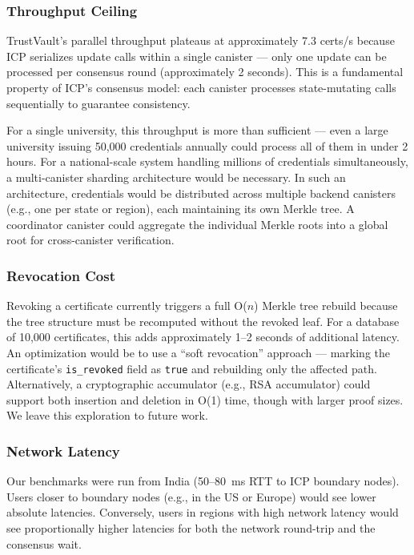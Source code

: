 \documentclass[conference]{IEEEtran}
\begin{document}
\subsubsection{Throughput Ceiling}
TrustVault's parallel throughput plateaus at approximately 7.3 certs/s because ICP serializes update calls within a single canister — only one update can be processed per consensus round (approximately 2 seconds). This is a fundamental property of ICP's consensus model: each canister processes state-mutating calls sequentially to guarantee consistency.

For a single university, this throughput is more than sufficient — even a large university issuing 50,000 credentials annually could process all of them in under 2 hours. For a national-scale system handling millions of credentials simultaneously, a multi-canister sharding architecture would be necessary. In such an architecture, credentials would be distributed across multiple backend canisters (e.g., one per state or region), each maintaining its own Merkle tree. A coordinator canister could aggregate the individual Merkle roots into a global root for cross-canister verification.

\subsubsection{Revocation Cost}
Revoking a certificate currently triggers a full O($n$) Merkle tree rebuild because the tree structure must be recomputed without the revoked leaf. For a database of 10,000 certificates, this adds approximately 1--2 seconds of additional latency. An optimization would be to use a ``soft revocation'' approach — marking the certificate's \texttt{is\_revoked} field as \texttt{true} and rebuilding only the affected path. Alternatively, a cryptographic accumulator (e.g., RSA accumulator) could support both insertion and deletion in O(1) time, though with larger proof sizes. We leave this exploration to future work.

\subsubsection{Network Latency}
Our benchmarks were run from India (50--80~ms RTT to ICP boundary nodes). Users closer to boundary nodes (e.g., in the US or Europe) would see lower absolute latencies. Conversely, users in regions with high network latency would see proportionally higher latencies for both the network round-trip and the consensus wait.
\end{document}

